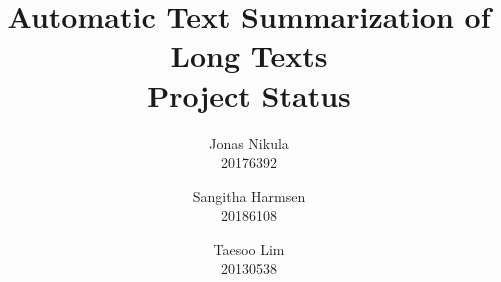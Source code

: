 \documentclass{article}
\title{Automatic Text Summarization of Long Texts \\ Project Status} %
\author{Jonas Nikula \\ 20176392
\and Sangitha Harmsen \\ 20186108
\and Taesoo Lim \\ 20130538} %
\date{} %
\begin{document}
\maketitle %






\printbibliography{}

\end{document}
